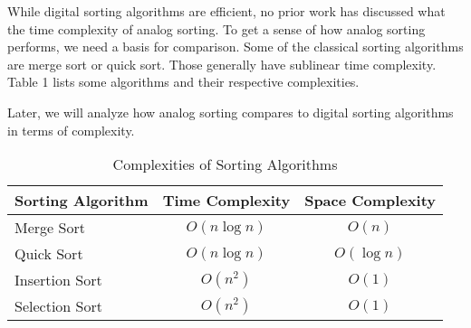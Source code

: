 While digital sorting algorithms are efficient, no prior work has discussed what the time complexity of analog sorting. To get a sense of how analog sorting performs, we need a basis for comparison. Some of the classical sorting algorithms are merge sort or quick sort. Those generally have sublinear time complexity. Table 1 lists some algorithms and their respective complexities.

Later, we will analyze how analog sorting compares to digital sorting algorithms in terms of complexity. 

\begin{table}[h]
\centering
\caption{Complexities of Sorting Algorithms}
\begin{tabular}{|l|c|c|} \hline
Sorting Algorithm&Time Complexity&Space Complexity\\ \hline
Merge Sort & $O(n\log n)$& $O(n)$\\ \hline
Quick Sort & $O(n\log n)$& $O(\log n)$\\ \hline
Insertion Sort & $O(n^2)$& $O(1)$\\ \hline
Selection Sort & $O(n^2)$& $O(1)$\\
\hline\end{tabular}
\end{table}



